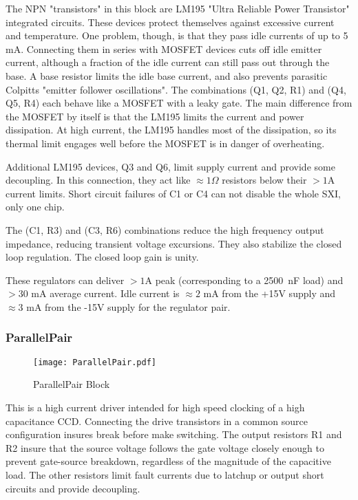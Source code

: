 \documentclass[a4paper,12pt]{article}
\begin{document}
The NPN "transistors" in this block are LM195 "Ultra Reliable Power Transistor" integrated circuits. These devices protect themselves against excessive current and temperature. One problem, though, is that they pass idle currents of up to 5 mA. Connecting them in series with MOSFET devices cuts off idle emitter current, although a fraction of the idle current can still pass out through the base. A base resistor limits the idle base current, and also prevents parasitic Colpitts "emitter follower oscillations". The combinations (Q1, Q2, R1) and (Q4, Q5, R4) each behave like a MOSFET with a leaky gate. The main difference from the MOSFET by itself is that the LM195 limits the current and power dissipation. At high current, the LM195 handles most of the dissipation, so its thermal limit engages well before the MOSFET  is in danger of overheating.

Additional LM195 devices, Q3 and Q6, limit supply current and provide some decoupling. In this connection, they act like $\approx 1\Omega$ resistors below their $>1$A current limits. Short circuit failures of C1 or C4 can not disable the whole SXI, only one chip.

The (C1, R3) and (C3, R6) combinations reduce the high frequency output impedance, reducing transient voltage excursions. They also stabilize the closed loop regulation. The closed loop gain is unity.

These regulators can deliver $>1$A peak (corresponding to a 2500\ nF load) and $>30$ mA average current. Idle current is  $\approx 2$ mA from the +15V supply and $\approx 3$ mA from the -15V supply for the regulator pair.

\subsubsection{ParallelPair}

   \begin{figure}
   \begin{center}
   \texttt{[image: ParallelPair.pdf]}
   \end{center}
   \caption{ParallelPair Block}
   \end{figure}

This is a high current driver intended for high speed clocking of a high capacitance CCD. Connecting the drive transistors in a common source configuration insures break before make switching. The output resistors R1 and R2 insure that the source voltage follows the gate voltage closely enough to prevent gate-source breakdown, regardless of the magnitude of the capacitive load. The other resistors limit fault currents due to latchup or output short circuits and provide decoupling.
\end{document}
